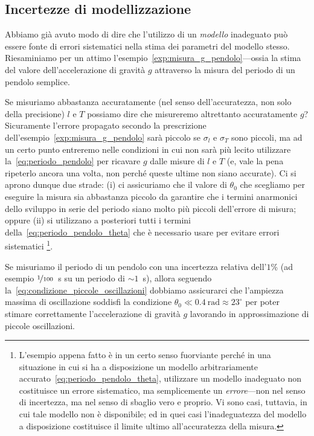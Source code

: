 \subsection{Incertezze di modellizzazione}

Abbiamo già avuto modo di dire che l'utilizzo di un \emph{modello} inadeguato
può essere fonte di errori sistematici nella stima dei parametri del modello
stesso. Riesaminiamo per un attimo l'esempio~\ref{exp:misura_g_pendolo}---ossia
la stima del valore dell'accelerazione di gravità $g$ attraverso la misura
del periodo di un pendolo semplice.

Se misuriamo abbastanza accuratamente (nel senso dell'accuratezza, non solo
della precisione) $l$ e $T$ possiamo dire che misureremo altrettanto
accuratamente $g$? Sicuramente l'errore propagato secondo la prescrizione
dell'esempio~\ref{exp:misura_g_pendolo} sarà piccolo se $\sigma_l$ e
$\sigma_T$ sono piccoli, ma ad un certo punto entreremo nelle condizioni
in cui non sarà più lecito utilizzare la~\eqref{eq:periodo_pendolo}
per ricavare $g$ dalle misure di $l$ e $T$ (e, vale la pena ripeterlo ancora
una volta, non perché queste ultime non siano accurate).
Ci si aprono dunque due strade: (i) ci assicuriamo che il valore di
$\theta_0$ che scegliamo per eseguire la misura sia abbastanza piccolo da
garantire che i termini anarmonici dello sviluppo in serie del periodo siano
molto più piccoli dell'errore di misura; oppure (ii) si utilizzano a
posteriori tutti i termini della~\eqref{eq:periodo_pendolo_theta} che è
necessario usare per evitare errori sistematici%
\footnote{L'esempio appena fatto è in un certo senso fuorviante perché in
  una situazione in cui si ha a disposizione un modello arbitrariamente
  accurato~\eqref{eq:periodo_pendolo_theta}, utilizzare un modello inadeguato
  non costituisce un errore sistematico, ma semplicemente un
  \emph{errore}---non nel senso di incertezza, ma nel senso di sbaglio vero e
  proprio. Vi sono casi, tuttavia, in cui tale modello non è disponibile;
  ed in quei casi l'inadeguatezza del modello a disposizione costituisce il
  limite ultimo all'accuratezza della misura.}.

\begin{examplebox}
  \begin{example}
    Se misuriamo il periodo di un pendolo con una incertezza relativa
    dell'$1$\% (ad esempio $\nicefrac{1}{100}$~s su un periodo di $\sim 1$~s),
    allora seguendo la~\eqref{eq:condizione_piccole_oscillazioni}
    dobbiamo assicurarci che l'ampiezza massima di oscillazione
    soddisfi la condizione $\theta_0 \ll 0.4~\text{rad} \approx 23^\circ$
    per poter stimare correttamente l'accelerazione di gravità $g$ lavorando
    in approssimazione di piccole oscillazioni.
  \end{example}
\end{examplebox}


